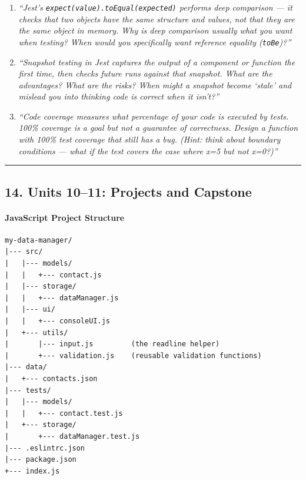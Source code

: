 \documentclass[
  justified,
  openright,
]{tufte-book}
\let\subsubsection\paragraph
\let\paragraph\paragraph
\let\subsubsection\paragraph
\let\paragraph\paragraph
\begin{document}
\begin{enumerate}
\def\labelenumi{\arabic{enumi}.}
\item
  \emph{``Jest's \texttt{expect(value).toEqual(expected)} performs deep
  comparison --- it checks that two objects have the same structure and
  values, not that they are the same object in memory. Why is deep
  comparison usually what you want when testing? When would you
  specifically want reference equality (\texttt{toBe})?''}
\item
  \emph{``Snapshot testing in Jest captures the output of a component or
  function the first time, then checks future runs against that
  snapshot. What are the advantages? What are the risks? When might a
  snapshot become `stale' and mislead you into thinking code is correct
  when it isn't?''}
\item
  \emph{``Code coverage measures what percentage of your code is
  executed by tests. 100\% coverage is a goal but not a guarantee of
  correctness. Design a function with 100\% test coverage that still has
  a bug. (Hint: think about boundary conditions --- what if the test
  covers the case where x=5 but not x=0?)''}
\end{enumerate}

\begin{center}\rule{0.5\linewidth}{0.5pt}\end{center}

\subsection{14. Units 10--11: Projects and
Capstone}\label{units-1011-projects-and-capstone}

\subsubsection{JavaScript Project
Structure}\label{javascript-project-structure}

\begin{verbatim}
my-data-manager/
|--- src/
|   |--- models/
|   |   +--- contact.js
|   |--- storage/
|   |   +--- dataManager.js
|   |--- ui/
|   |   +--- consoleUI.js
|   +--- utils/
|       |--- input.js         (the readline helper)
|       +--- validation.js    (reusable validation functions)
|--- data/
|   +--- contacts.json
|--- tests/
|   |--- models/
|   |   +--- contact.test.js
|   +--- storage/
|       +--- dataManager.test.js
|--- .eslintrc.json
|--- package.json
+--- index.js
\end{verbatim}
\end{document}
